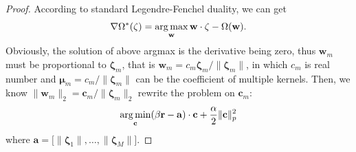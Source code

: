 \documentclass{article}
\newcommand{\argmax}{\operatornamewithlimits{arg\,max}}
\newcommand{\argmin}{\operatornamewithlimits{arg\,min}}
\begin{document}
\begin{proof}
According to standard Legendre-Fenchel duality, we can get
\begin{align}
\nabla\Omega^*(\mathbf{\zeta})=\argmax\limits_{\mathbf{w}} \mathbf{w} \cdot \mathbf{\zeta} - \Omega(\mathbf{w}).
\end{align}
Obviously, the solution of above argmax is the derivative being zero, thus $\mathbf{w}_m$ must be proportional to $\mathbf{\zeta}_m$, that is $\mathbf{w}_m=c_m\mathbf{\zeta}_m/\|\mathbf{\zeta}_m\|$, in which $c_m$ is real number and $\mathbf{\mu}_m=c_m/\|\mathbf{\zeta}_m\|$ can be the coefficient of multiple kernels. Then, we know $\|\mathbf{w}_m\|_2=\mathbf{c}_m/\|\mathbf{\zeta}_m\|_2$ rewrite the problem on $\mathbf{c}_m$:
\begin{align}
    \label{lp-regularization}
    \argmin \limits_{\mathbf{c}} (\beta\mathbf{r} - \mathbf{a})\cdot\mathbf{c}+\frac{\alpha}{2}\|\mathbf{c}\|_p^2
\end{align}
where $\mathbf{a}=\Big[\|\mathbf{\zeta}_1\|,\ldots, \|\mathbf{\zeta}_M\|\Big]$.


\end{proof}
\end{document}
